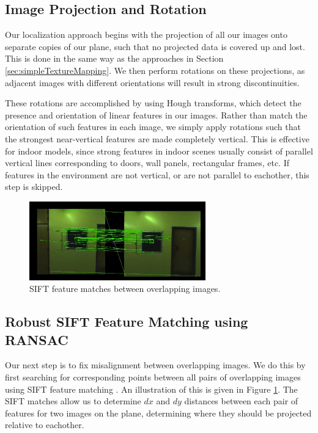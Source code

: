 \documentclass[10pt,twocolumn,letterpaper]{article}
\begin{document}
\subsection{Image Projection and Rotation}
\label{sec:projectionAndRotation}
Our localization approach begins with the projection of all our images
onto separate copies of our plane, such that no projected data is
covered up and lost. This is done in the same way as the approaches in
Section \ref{sec:simpleTextureMapping}. We then perform rotations on
these projections, as adjacent images with different orientations will
result in strong discontinuities.

These rotations are accomplished by using Hough transforms, which
detect the presence and orientation of linear features in our
images. Rather than match the orientation of such features in each
image, we simply apply rotations such that the strongest near-vertical
features are made completely vertical. This is effective for indoor
models, since strong features in indoor scenes usually consist of
parallel vertical lines corresponding to doors, wall panels,
rectangular frames, etc. If features in the environment are not
vertical, or are not parallel to eachother, this step is skipped.


\begin{figure}
  \centering
  \includegraphics[width=3in]{matches.jpg}
  \caption{SIFT feature matches between overlapping images.}
  \label{fig:matches}
\end{figure}



\subsection{Robust SIFT Feature Matching using RANSAC}
\label{sec:robustSIFTFeatureMatching}
Our next step is to fix misalignment between overlapping images. We do
this by first searching for corresponding points between all pairs of
overlapping images using SIFT feature matching
\cite{lowe1999object}. An illustration of this is given in Figure
\ref{fig:matches}. The SIFT matches allow us to determine $dx$ and
$dy$ distances between each pair of features for two images on the
plane, determining where they should be projected relative to
eachother.
\end{document}
